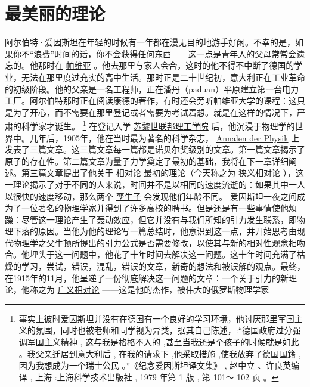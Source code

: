 	\chapter{最美丽的理论}
\indent

    阿尔伯特·爱因斯坦在年轻的时候有一年都在漫无目的地游手好闲。不幸的是，如果你不“浪费”时间的话，你不会获得任何东西——这一点是青年人的父母常常会遗忘的。他那时在
\href{http://toyhouse.cc/wiki/index.php/帕维亚}{帕维亚}
。他去那里与家人会合，这时的他不得不中断了德国的学业，无法在那里度过充实的高中生活。那时正是二十世纪初，意大利正在工业革命的初级阶段。他的父亲是一名工程师，正在潘丹（paduan）平原建立第一台电力工厂。阿尔伯特那时正在阅读康德的著作，有时还会旁听帕维亚大学的课程：这只是为了开心，而不需要在那里登记或者需要为考试着想。就是在这样的情况下，严肃的科学家才诞生。
\footnote[1]
{
事实上彼时爱因斯坦并没有在德国有一个良好的学习环境，他讨厌那里军国主义的氛围，同时也被老师和同学视为异类，据其自己陈述，:“德国政府过分强调军国主义精神 , 这与我是格格不入的 ,甚至当我还是个孩子的时候就是如此 。我父亲迁居到意大利后 , 在我的请求下 ,他采取措施 ,使我放弃了德国国籍 , 因为我想成为一个瑞士公民 。”《纪念爱因斯坦译文集》 , 赵中立 、许良英编译 , 上海 :上海科学技术出版社 , 1979 年第 1 版 , 第 101～ 102 页 。
}
    在登记入学
\href{http://toyhouse.cc/wiki/index.php/苏黎世联邦理工学院}{苏黎世联邦理工学院}
后，他沉浸于物理学的世界中。几年后，1905年，他在当时最为著名的科学杂志，
\href{https://en.wikipedia.org/wiki/Annalen_der_Physik}{Annalen der Physik}
上发表了三篇文章。这三篇文章每一篇都是诺贝尔奖级别的文章。第一篇文章揭示了原子的存在性。第二篇文章为量子力学奠定了最初的基础，我将在下一章详细阐述。第三篇文章提出了他关于
\href{http://toyhouse.cc/wiki/index.php/相对论}{相对论}
最初的理论（今天称之为
\href{http://toyhouse.cc/wiki/index.php/狭义相对论}{狭义相对论}
），这一理论揭示了对于不同的人来说，时间并不是以相同的速度流逝的：如果其中一人以很快的速度移动，那么两个
\href{http://toyhouse.cc/wiki/index.php/孪生子}{孪生子}
会发现他们年龄不同。
    爱因斯坦一夜之间成为了一位著名的物理学家并得到了许多高校的聘书。但是还是有一些事情使他烦躁：尽管这一理论产生了轰动效应，但它并没有与我们所知的引力发生联系，即物理下落的原因。当他为他的理论写一篇总结时，他意识到这一点，并开始思考由现代物理学之父牛顿所提出的引力公式是否需要修改，以使其与新的相对性观念相吻合。他埋头于这一问题中，他花了十年时间去解决这一问题。这十年时间充满了枯燥的学习，尝试，错误，混乱，错误的文章，新奇的想法和被误解的观点。最终，在1915年的11月，他呈递了一份彻底解决这一问题的文章：一个关于引力的新理论，他称之为
\href{http://toyhouse.cc/wiki/index.php/广义相对论}{广义相对论}
——这是他的杰作，被伟大的俄罗斯物理学家
